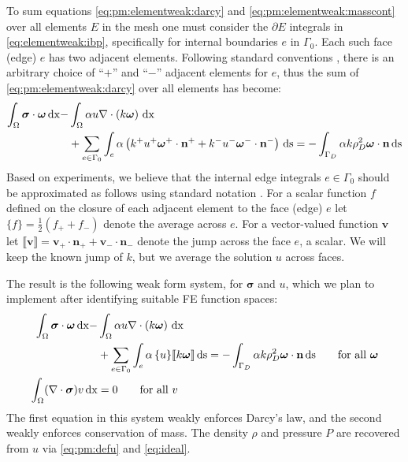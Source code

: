 \documentclass[11pt]{amsart}
\newcommand{\bn}{\mathbf{n}}
\newcommand{\bv}{\mathbf{v}}
\newcommand{\bsigma}{\bm{\sigma}}
\newcommand{\bomega}{\bm{\omega}}
\newcommand{\dx}{\mathrm{dx}}
\newcommand{\ds}{\mathrm{ds}}
\newcommand{\Div}{\nabla\cdot}
\newcommand{\jump}[1]{\llbracket #1 \rrbracket }
\begin{document}
To sum equations \eqref{eq:pm:elementweak:darcy} and \eqref{eq:pm:elementweak:masscont} over all elements $E$ in the mesh one must consider the $\partial E$ integrals in \eqref{eq:elementweak:ibp}, specifically for internal boundaries $e$ in $\Gamma_0$.  Each such face (edge) $e$ has two adjacent elements.  Following standard conventions \citep{Arnold2002,Ham2023}, there is an arbitrary choice of ``$+$'' and ``$-$'' adjacent elements for $e$, thus the sum of \eqref{eq:pm:elementweak:darcy} over all elements has become:
\begin{align}
\int_\Omega \bsigma\cdot \bomega\,\dx - &\int_\Omega \alpha u \Div\left(k \bomega\right)\,\dx \label{eq:elementweak:darcy:second} \\
&+ \sum_{e\in\Gamma_0} \int_e \alpha \left(k^+ u^+ \bomega^+\cdot\bn^+ + k^- u^- \bomega^-\cdot\bn^-\right)\,\ds = - \int_{\Gamma_D} \alpha k \rho_D^2 \bomega\cdot\bn\,\ds \notag
\end{align}
Based on experiments, we believe that the internal edge integrals $e\in\Gamma_0$ should be approximated as follows using standard notation \citep{Arnold2002}.  For a scalar function $f$ defined on the closure of each adjacent element to the face (edge) $e$ let $\{f\} = \frac{1}{2} (f_+ + f_-)$ denote the average across $e$.  For a vector-valued function $\bv$ let $\jump{\bv} = \bv_+ \cdot \bn_+ + \bv_- \cdot \bn_-$ denote the jump across the face $e$, a scalar.  We will keep the known jump of $k$, but we average the solution $u$ across faces.

The result is the following weak form system, for $\bsigma$ and $u$, which we plan to implement after identifying suitable FE function spaces:
\begin{subequations}
\label{eq:weaku}
\begin{align}
\int_\Omega \bsigma\cdot \bomega\,\dx - &\int_\Omega \alpha u \Div\left(k \bomega\right)\,\dx \label{eq:weaku:darcy} \\
&+ \sum_{e\in\Gamma_0} \int_e \alpha\, \{u\} \jump{k\bomega}\,\ds = - \int_{\Gamma_D} \alpha k \rho_D^2 \bomega\cdot\bn\,\ds \qquad \text{for all } \bomega \notag \\
\int_\Omega (\Div \bsigma) v\,\dx &= 0 \qquad \text{for all } v  \label{eq:weaku:masscont}
\end{align}
\end{subequations}
The first equation in this system weakly enforces Darcy's law, and the second weakly enforces conservation of mass.  The density $\rho$ and pressure $P$ are recovered from $u$ via \eqref{eq:pm:defu} and \eqref{eq:ideal}.
\end{document}
